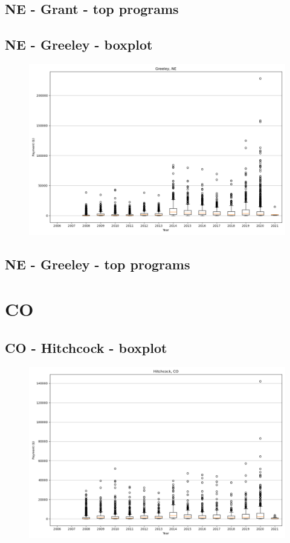 \subsection*{NE - Grant - top programs}

\newpage
\subsection*{NE - Greeley - boxplot}
\begin{figure}[h]
\centering
\includegraphics[width=7in]{../output/boxplots/counties/Greeley-NE_boxplot.png}
\end{figure}


\subsection*{NE - Greeley - top programs}

\newpage
\section*{CO}
\subsection*{CO - Hitchcock - boxplot}
\begin{figure}[h]
\centering
\includegraphics[width=7in]{../output/boxplots/counties/Hitchcock-CO_boxplot.png}
\end{figure}


